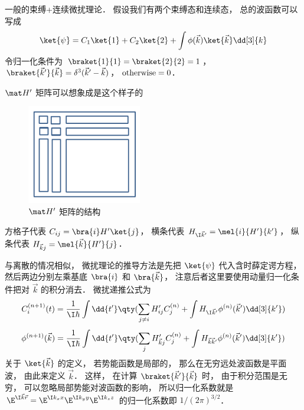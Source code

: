 

一般的束缚+连续微扰理论． 假设我们有两个束缚态和连续态， 总的波函数可以写成
 \begin{equation}
\ket{\psi} = C_1\ket{1} + C_2\ket{2} + \int \phi (\vec k)\ket{\vec k} \dd[3]{k}
\end{equation}
令归一化条件为 $\braket{1}{1} = \braket{2}{2} = 1$，  $\braket{\vec k'}{\vec k}  = \delta ^3 (\vec k' - \vec k)$，  $\rm{otherwise} = 0$． 

 $\mat H'$  矩阵可以想象成是这个样子的
\begin{figure}[ht]
\centering
\includegraphics[width=5cm]{./figures/PTCont1.pdf}
\caption{$\mat H'$ 矩阵的结构} 
\end{figure}

方格子代表 $C_{ij} = \bra{i} H' \ket{j}$， 横条代表 $H_{\I\vec k'} = \mel{i}{H'}{k'}$，  纵条代表 $H_{\vec k j} = \mel{\vec k}{H'}{j}$． 

与离散的情况相似， 微扰理论的推导方法是先把 $\ket{\psi}$ 代入含时薛定谔方程， 然后两边分别左乘基底 $\bra{i}$ 和 $\bra{\vec k}$，  注意后者这里要使用动量归一化条件把对 $\vec k$ 的积分消去． 微扰递推公式为
 \begin{equation}
C_i^{(n + 1)}(t) = \frac{1}{\I\hbar} \int \dd{t'} \qty(\sum_{j \ne i} H'_{ij} C_j^{(n)} + \int H_{\I\vec k'} \phi ^{(n)} (\vec k') \dd[3]{k'} )
\end{equation}
\begin{equation}
\phi^{(n+1)}(\vec k) = \frac{1}{\I\hbar} \int \dd{t'} \qty(\sum_j H'_{\vec kj} C_j^{(n)} + \int H_{\vec k\vec k'} \phi ^{(n)}(\vec k') \dd[3]{k'})
\end{equation}
关于 $\ket{\vec k}$  的定义， 若势能函数是局部的， 那么在无穷远处波函数是平面波， 由此来定义 $\vec k$．  这样， 在计算 $\braket{\vec k'}{\vec k}$ 时， 由于积分范围是无穷， 可以忽略局部势能对波函数的影响， 所以归一化系数就是 $\E^{\I \vec k\vec r} = \E^{\I k_x x} \E^{\I k_y y} \E^{\I k_z z}$ 的归一化系数即 $1/{(2\pi )^{3/2}}$． 
 
